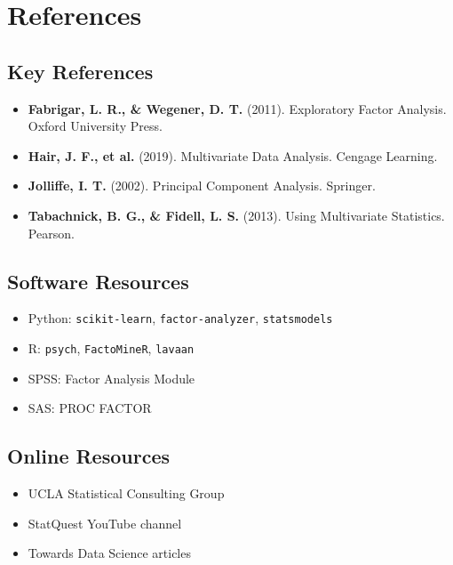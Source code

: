 \documentclass[
]{article}
\begin{document}
\section{References}

\subsection{Key References}

\begin{itemize}
\item
  \textbf{Fabrigar, L. R., \& Wegener, D. T.} (2011). Exploratory Factor
  Analysis. Oxford University Press.
\item
  \textbf{Hair, J. F., et al.} (2019). Multivariate Data Analysis.
  Cengage Learning.
\item
  \textbf{Jolliffe, I. T.} (2002). Principal Component Analysis.
  Springer.
\item
  \textbf{Tabachnick, B. G., \& Fidell, L. S.} (2013). Using
  Multivariate Statistics. Pearson.
\end{itemize}

\subsection{Software Resources}

\begin{itemize}
\item
  Python: \texttt{scikit-learn}, \texttt{factor-analyzer},
  \texttt{statsmodels}
\item
  R: \texttt{psych}, \texttt{FactoMineR}, \texttt{lavaan}
\item
  SPSS: Factor Analysis Module
\item
  SAS: PROC FACTOR
\end{itemize}

\subsection{Online Resources}

\begin{itemize}
\item
  UCLA Statistical Consulting Group
\item
  StatQuest YouTube channel
\item
  Towards Data Science articles
\end{itemize}
\end{document}
